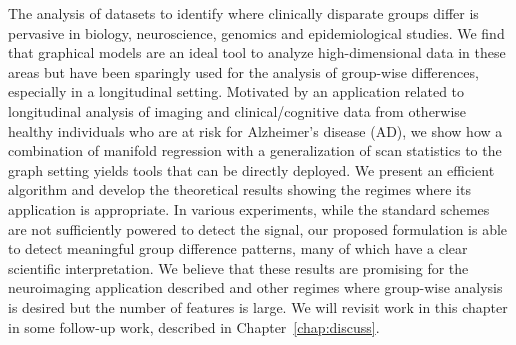 The analysis of datasets to identify where clinically disparate groups differ is pervasive in biology, neuroscience, genomics and epidemiological studies. 
We find that graphical models are an ideal tool to analyze high-dimensional data in these areas but have been sparingly used for the analysis of 
group-wise differences, especially in a longitudinal setting. 
Motivated by an application related to longitudinal analysis of imaging and clinical/cognitive data from otherwise healthy individuals 
who are at risk for Alzheimer's disease (AD), we show how a combination of manifold regression with a generalization of scan statistics to the graph setting yields 
tools that can be directly deployed. 
We present an efficient algorithm and develop the theoretical results showing the regimes where its application is appropriate. 
In various experiments, while the standard schemes are not sufficiently powered to detect the signal, our proposed formulation is able to 
detect meaningful group difference patterns, many of which have a clear scientific interpretation. 
We believe that these results are promising for the neuroimaging application 
described and other regimes where group-wise analysis is desired but the number of features is large. 
We will revisit work in this chapter in some follow-up work, described in Chapter~\ref{chap:discuss}.